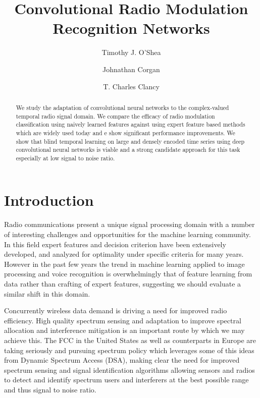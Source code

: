\documentclass[runningheads,a4paper]{llncs}
\begin{document}
 

\title{Convolutional Radio Modulation Recognition Networks}

\author{Timothy J. O'Shea  \and Johnathan Corgan \and T. Charles Clancy  }


\maketitle

\begin{abstract} 
We study the adaptation of convolutional neural networks to the complex-valued temporal radio signal domain.  We compare the efficacy of radio modulation classification using naively learned features against using expert feature based methods which are widely used today and e show significant performance improvements.  We show that blind temporal learning on large and densely encoded time series using deep convolutional neural networks is viable and a strong candidate approach for this task especially at low signal to noise ratio.
\end{abstract} 



\section{Introduction}
Radio communications present a unique signal processing domain with a number of interesting challenges and opportunities for the machine learning community.
In this field expert features and decision criterion have been extensively developed, and analyzed for optimality under specific criteria for many years.  
However in the past few years the trend in machine learning applied to image processing \cite{imagenet} and voice recognition \cite{cldnn} is overwhelmingly that of feature learning from data rather than crafting of expert features, suggesting we should evaluate a similar shift in this domain.

Concurrently wireless data demand is driving a need for improved radio efficiency.  High quality spectrum sensing and adaptation to improve spectral allocation and interference mitigation is an important route by which we may achieve this.  The FCC in the United States as well as counterparts in Europe are taking seriously and pursuing spectrum policy which leverages some of this ideas from Dynamic Spectrum Access (DSA)\cite{dsa}, making clear the need for improved spectrum sensing and signal identification algorithms allowing sensors and radios to detect and identify spectrum users and interferers at the best possible range and thus signal to noise ratio.
\end{document}
